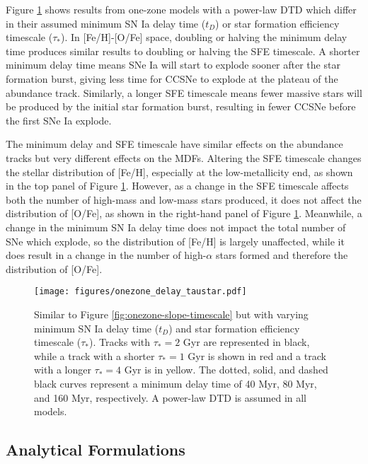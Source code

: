 \documentclass[twocolumn,linenumbers,twocolappendix]{aastex631}
\begin{document}
Figure \ref{fig:onezone-delay-taustar} shows results from one-zone models with a power-law DTD which differ in their assumed minimum SN Ia delay time ($t_D$) or star formation efficiency timescale ($\tau_*$). In [Fe/H]-[O/Fe] space, doubling or halving the minimum delay time produces similar results to doubling or halving the SFE timescale. A shorter minimum delay time means SNe Ia will start to explode sooner after the star formation burst, giving less time for CCSNe to explode at the plateau of the abundance track. Similarly, a longer SFE timescale means fewer massive stars will be produced by the initial star formation burst, resulting in fewer CCSNe before the first SNe Ia explode. 

The minimum delay and SFE timescale have similar effects on the abundance tracks but very different effects on the MDFs. Altering the SFE timescale changes the stellar distribution of [Fe/H], especially at the low-metallicity end, as shown in the top panel of Figure \ref{fig:onezone-delay-taustar}. However, as a change in the SFE timescale affects both the number of high-mass and low-mass stars produced, it does not affect the distribution of [O/Fe], as shown in the right-hand panel of Figure \ref{fig:onezone-delay-taustar}. Meanwhile, a change in the minimum SN Ia delay time does not impact the total number of SNe which explode, so the distribution of [Fe/H] is largely unaffected, while it does result in a change in the number of high-$\alpha$ stars formed and therefore the distribution of [O/Fe].

\begin{figure}
    \centering
    \texttt{[image: figures/onezone\_delay\_taustar.pdf]}
    \caption{Similar to Figure \ref{fig:onezone-slope-timescale} but with varying minimum SN Ia delay time ($t_D$) and star formation efficiency timescale ($\tau_*$). Tracks with $\tau_*=2$ Gyr are represented in black, while a track with a shorter $\tau_*=1$ Gyr is shown in red and a track with a longer $\tau_*=4$ Gyr is in yellow. The dotted, solid, and dashed black curves represent a minimum delay time of 40 Myr, 80 Myr, and 160 Myr, respectively. A power-law DTD is assumed in all models.}
    \label{fig:onezone-delay-taustar}
\end{figure}

\subsection{Analytical Formulations}
\end{document}
